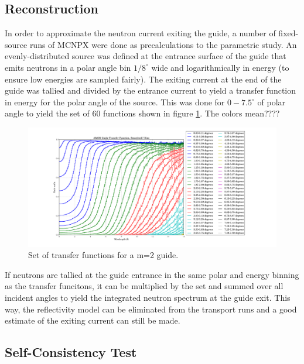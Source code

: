 \documentclass[a4paper]{jpconf}
\begin{document}
\subsection{Reconstruction}

In order to approximate the neutron current exiting the guide, a number of fixed-source runs of MCNPX were done as precalculations to the parametric study.  An evenly-distributed source was defined at the entrance surface of the guide that emits neutrons in a polar angle bin $1/8^\circ$ wide and logarithmically in energy (to ensure low energies are sampled fairly).  The exiting current at the end of the guide was tallied and divided by the entrance current to yield a transfer function in energy for the polar angle of the source.  This was done for $0-7.5^\circ$ of polar angle to yield the set of 60 functions shown in figure \ref{xfer_func}.  The colors mean????

\begin{figure}
\begin{center}
\includegraphics[scale=0.3,trim={2cm 1.7cm 2cm 0.8cm},clip]{graphics/xfer_func.pdf}
\end{center}
\caption{\label{xfer_func}Set of transfer functions for a m=2 guide.}
\end{figure}

If neutrons are tallied at the guide entrance in the same polar and energy binning as the transfer funcitons, it can be multiplied by the set and summed over all incident angles to yield the integrated neutron spectrum at the guide exit.  This way, the reflectivity model can be eliminated from the transport runs and a good estimate of the exiting current can still be made.

\subsection{Self-Consistency Test}
\end{document}
